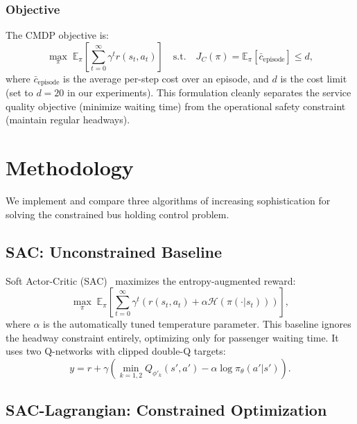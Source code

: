 \documentclass[10pt]{article}
\begin{document}
\subsubsection{Objective}

The CMDP objective is:
\begin{equation}
    \max_{\pi} \; \mathbb{E}_{\pi}\left[\sum_{t=0}^{\infty} \gamma^t r(s_t, a_t)\right] \quad \text{s.t.} \quad J_C(\pi) = \mathbb{E}_{\pi}\left[\bar{c}_{\text{episode}}\right] \leq d,
    \label{eq:cmdp}
\end{equation}
where $\bar{c}_{\text{episode}}$ is the average per-step cost over an episode, and $d$ is the cost limit (set to $d=20$ in our experiments). This formulation cleanly separates the service quality objective (minimize waiting time) from the operational safety constraint (maintain regular headways).


\section{Methodology}
\label{sec:method}

We implement and compare three algorithms of increasing sophistication for solving the constrained bus holding control problem.

\subsection{SAC: Unconstrained Baseline}

Soft Actor-Critic (SAC)~\cite{Haarnoja2018SAC} maximizes the entropy-augmented reward:
\begin{equation}
    \max_\pi \; \mathbb{E}_\pi \left[ \sum_{t=0}^{\infty} \gamma^t \left( r(s_t, a_t) + \alpha \mathcal{H}(\pi(\cdot|s_t)) \right) \right],
\end{equation}
where $\alpha$ is the automatically tuned temperature parameter. This baseline ignores the headway constraint entirely, optimizing only for passenger waiting time. It uses two Q-networks with clipped double-Q targets:
\begin{equation}
    y = r + \gamma \left( \min_{k=1,2} Q_{\phi'_k}(s', a') - \alpha \log \pi_\theta(a'|s') \right).
\end{equation}

\subsection{SAC-Lagrangian: Constrained Optimization}
\end{document}
